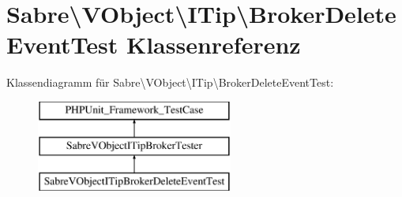 \hypertarget{class_sabre_1_1_v_object_1_1_i_tip_1_1_broker_delete_event_test}{}\section{Sabre\textbackslash{}V\+Object\textbackslash{}I\+Tip\textbackslash{}Broker\+Delete\+Event\+Test Klassenreferenz}
\label{class_sabre_1_1_v_object_1_1_i_tip_1_1_broker_delete_event_test}
Klassendiagramm für Sabre\textbackslash{}V\+Object\textbackslash{}I\+Tip\textbackslash{}Broker\+Delete\+Event\+Test\+:\begin{figure}[H]
\begin{center}
\leavevmode
\includegraphics[height=3.000000cm]{class_sabre_1_1_v_object_1_1_i_tip_1_1_broker_delete_event_test}
\end{center}
\end{figure}
